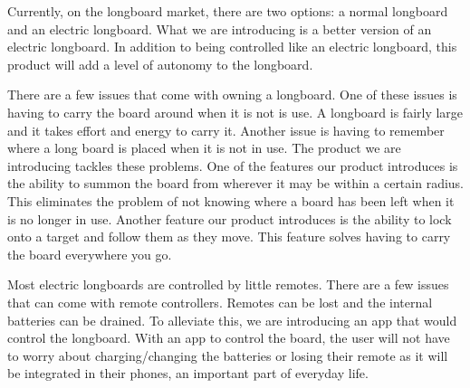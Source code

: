 
Currently, on the longboard market, there are two options: a normal longboard and an electric longboard. What we are introducing is a better version of an electric longboard. In addition to being controlled like an electric longboard, this product will add a level of autonomy to the longboard. 


There are a few issues that come with owning a longboard. One of these issues is having to carry the board around when it is not is use. A longboard is fairly large and it takes effort and energy to carry it. Another issue is having to remember where a long board is placed when it is not in use. The product we are introducing tackles these problems. One of the features our product introduces is the ability to summon the board from wherever it may be within a certain radius. This eliminates the problem of not knowing where a board has been left when it is no longer in use. Another feature our product introduces is the ability to lock onto a target and follow them as they move. This feature solves having to carry the board everywhere you go.

Most electric longboards are controlled by little remotes. There are a few issues that can come with remote controllers. Remotes can be lost and the internal batteries can be drained. To alleviate this, we are introducing an app that would control the longboard. With an app to control the board, the user will not have to worry about charging/changing the batteries or losing their remote as it will be integrated in their phones, an important part of everyday life.

